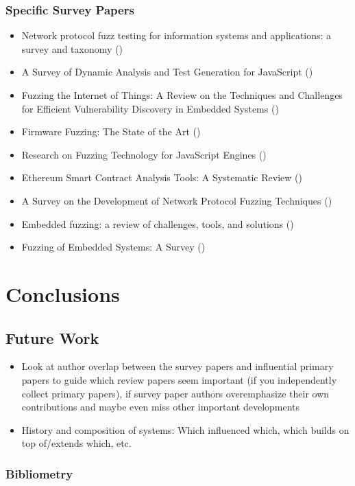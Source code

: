 \documentclass{article}
\begin{document}
\subsubsection{Specific Survey Papers}
\begin{itemize}
    \item    Network protocol fuzz testing for information systems and applications: a survey and taxonomy (\citeyear{Network})\cite{Network}
    \item    A Survey of Dynamic Analysis and Test Generation for JavaScript (\citeyear{JavaScript2})\cite{JavaScript2}
    \item    Fuzzing the Internet of Things: A Review on the Techniques and Challenges for Efficient Vulnerability Discovery in Embedded Systems (\citeyear{IoT})\cite{IoT}
    \item    Firmware Fuzzing: The State of the Art (\citeyear{Firmware})\cite{Firmware}
    \item    Research on Fuzzing Technology for JavaScript Engines (\citeyear{JavaScript})\cite{JavaScript}
    \item    Ethereum Smart Contract Analysis Tools: A Systematic Review (\citeyear{Ethereum})\cite{Ethereum}
    \item    A Survey on the Development of Network Protocol Fuzzing Techniques (\citeyear{Network2023})\cite{Network2023}
    \item    Embedded fuzzing: a review of challenges, tools, and solutions (\citeyear{Embedded2})\cite{Embedded2}
    \item    Fuzzing of Embedded Systems: A Survey (\citeyear{Embedded})\cite{Embedded}
\end{itemize}

\section{Conclusions}

\subsection{Future Work}
\begin{itemize}
    \item Look at author overlap between the survey papers and influential primary papers to guide which review papers seem important (if you independently collect primary papers), if survey paper authors overemphasize their own contributions and maybe even miss other important developments
    \item History and composition of systems: Which influenced which, which builds on top of/extends which, etc.
\end{itemize}

\subsubsection{Bibliometry}


\pagebreak
{}
\printbibliography[]
\end{document}
